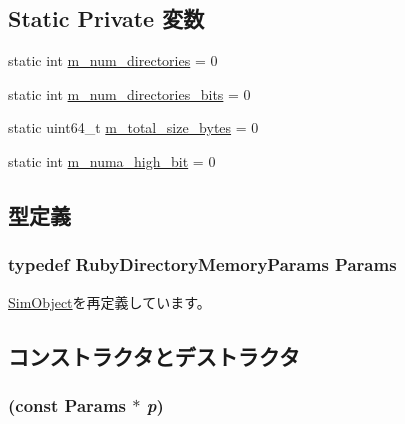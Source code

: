 \subsection*{Static Private 変数}
\begin{DoxyCompactItemize}
\item 
static int \hyperlink{classDirectoryMemory_a8da85f3707adb6fe1f8fc79f3035ae1c}{m\_\-num\_\-directories} = 0
\item 
static int \hyperlink{classDirectoryMemory_afc2721e5fac872cb9480a85bafbd8f64}{m\_\-num\_\-directories\_\-bits} = 0
\item 
static uint64\_\-t \hyperlink{classDirectoryMemory_a89d33b2d42ea8a07fdd28251d8c88ecc}{m\_\-total\_\-size\_\-bytes} = 0
\item 
static int \hyperlink{classDirectoryMemory_a61cd8c9a1cc11c804fa1680e2823316c}{m\_\-numa\_\-high\_\-bit} = 0
\end{DoxyCompactItemize}


\subsection{型定義}
\hypertarget{classDirectoryMemory_aafb743d69401c676144ae89b3d302665}{
\subsubsection[{Params}]{\setlength{\rightskip}{0pt plus 5cm}typedef RubyDirectoryMemoryParams {\bf Params}}}
\label{classDirectoryMemory_aafb743d69401c676144ae89b3d302665}


\hyperlink{classSimObject_a0f0761d2db586a23bb2a2880b8f387bb}{SimObject}を再定義しています。

\subsection{コンストラクタとデストラクタ}
\hypertarget{classDirectoryMemory_a49d302369a214b36aed2294da3df6344}{
\subsubsection[{DirectoryMemory}]{ (const {\bf Params} $\ast$ {\em p})}}
\label{classDirectoryMemory_a49d302369a214b36aed2294da3df6344}



